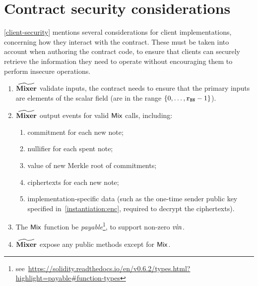 
\section{Contract security considerations}\label{contract-security}

\cref{client-security} mentions several considerations for client implementations, concerning how they interact with the contract. These must be taken into account when authoring the contract code, to ensure that clients can securely retrieve the information they need to operate without encouraging them to perform insecure operations.

\begin{enumerate}
  \item $\widetilde{\mathbf{Mixer}}$ \MUST{} validate inputs, the contract needs to ensure that the primary inputs are elements of the scalar field \FFx{\rBN} (are in the range $\{{0},\ldots,{\mathtt{r_{BN}} - 1}\}$).
  \item $\widetilde{\mathbf{Mixer}}$ \MUST{} output events for valid $\mathsf{Mix}$ calls, including:
      \begin{enumerate}
        \item commitment for each new note;
        \item nullifier for each spent note;
        \item value of new Merkle root of commitments;
        \item ciphertexts for each new note;
        \item implementation-specific data (such as the one-time sender public key specified in~\cref{instantiation:enc}, required to decrypt the ciphertexts).
      \end{enumerate}
  \item\label{contract-security:mixer-payable} The $\mathsf{Mix}$ function \MUST{} be \emph{payable}\footnote{see~\url{https://solidity.readthedocs.io/en/v0.6.2/types.html?highlight=payable\#function-types}}, to support non-zero $\mathit{vin}$.
  \item $\widetilde{\mathbf{Mixer}}$ \MUSTNOT{} expose any public methods except for $\mathsf{Mix}$.
\end{enumerate}
